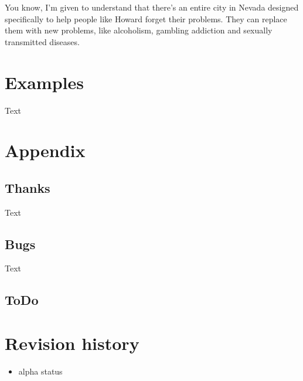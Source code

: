 \documentclass[openany,12pt,tocdepth=3]{ltx-md}
\begin{document}
\begin{ltxexample}[caption={Example \Cmd{xframedprintalloption}\OArgs[skip]},result=true,]
\begin{xframed}[margin=1cm,skip=1cm,]
 \xframedprintalloption[skip]
\end{xframed}
\end{ltxexample}



\begin{ltxexample}[caption={Example \Opt{developer-info}},result=true,]
\begin{xframed}[developer-info=true,margin=1cm,skip=1cm,
 first-title={Sheldon Cooper Quote},
 last-foot={End Sheldon Cooper Quote}]
  You know, I'm given to understand that there's an entire 
  city in Nevada designed specifically to help people like 
  Howard forget their problems. They can replace them with
  new problems, like alcoholism, gambling addiction and 
  sexually transmitted diseases.   
\end{xframed}
\end{ltxexample}




\chapter{Examples}\label{chap:examples}
Text 

\appendix
\chapter{Appendix}\label{chap:appendix}
\section{Thanks}
Text 
\section{Bugs}
Text 

\section{ToDo}
\chapter{Revision history}

\begin{itemize}
 \item alpha status
\end{itemize}
\end{document}
